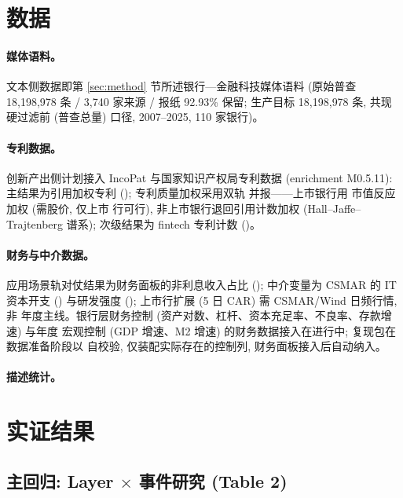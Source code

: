 \section{数据}\label{sec:data}

\paragraph{媒体语料。}
文本侧数据即第 \ref{sec:method} 节所述银行—金融科技媒体语料 (原始普查
18{,}198{,}978 条 / 3{,}740 家来源 / 报纸 92.93\% 保留; 生产目标 18{,}198{,}978 条,
共现硬过滤前 (普查总量) 口径, 2007--2025, 110 家银行)。

\paragraph{专利数据。}
创新产出侧计划接入 IncoPat 与国家知识产权局专利数据 (enrichment M0.5.11):
主结果为引用加权专利 (); 专利质量加权采用双轨
并报——上市银行用 \textcite{kogan2017technological} 市值反应加权 (需股价, 仅上市
行可行), 非上市银行退回引用计数加权 (Hall--Jaffe--Trajtenberg 谱系); 次级结果为
fintech 专利计数 ()。

\paragraph{财务与中介数据。}
应用场景轨对仗结果为财务面板的非利息收入占比 ();
中介变量为 CSMAR 的 IT 资本开支 () 与研发强度
(); 上市行扩展 (5 日 CAR) 需 CSMAR/Wind 日频行情, 非
年度主线。银行层财务控制 (资产对数、杠杆、资本充足率、不良率、存款增速) 与年度
宏观控制 (GDP 增速、M2 增速) 的财务数据接入在进行中; 复现包在数据准备阶段以
 自校验, 仅装配实际存在的控制列, 财务面板接入后自动纳入。

\paragraph{描述统计。}

\section{实证结果}\label{sec:results}

\subsection{主回归: Layer $\times$ 事件研究 (Table 2)}

